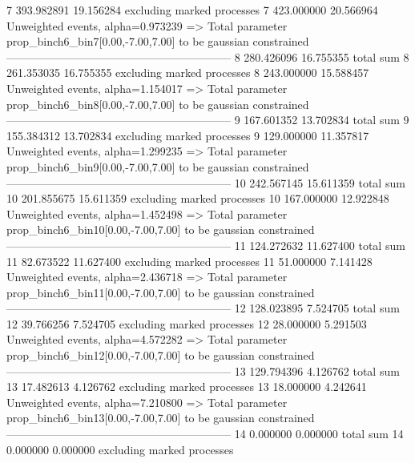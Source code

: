 7          393.982891      19.156284       excluding marked processes    
7          423.000000      20.566964       Unweighted events, alpha=0.973239
  => Total parameter prop_binch6_bin7[0.00,-7.00,7.00] to be gaussian constrained
------------------------------------------------------------
8          280.426096      16.755355       total sum                     
8          261.353035      16.755355       excluding marked processes    
8          243.000000      15.588457       Unweighted events, alpha=1.154017
  => Total parameter prop_binch6_bin8[0.00,-7.00,7.00] to be gaussian constrained
------------------------------------------------------------
9          167.601352      13.702834       total sum                     
9          155.384312      13.702834       excluding marked processes    
9          129.000000      11.357817       Unweighted events, alpha=1.299235
  => Total parameter prop_binch6_bin9[0.00,-7.00,7.00] to be gaussian constrained
------------------------------------------------------------
10         242.567145      15.611359       total sum                     
10         201.855675      15.611359       excluding marked processes    
10         167.000000      12.922848       Unweighted events, alpha=1.452498
  => Total parameter prop_binch6_bin10[0.00,-7.00,7.00] to be gaussian constrained
------------------------------------------------------------
11         124.272632      11.627400       total sum                     
11         82.673522       11.627400       excluding marked processes    
11         51.000000       7.141428        Unweighted events, alpha=2.436718
  => Total parameter prop_binch6_bin11[0.00,-7.00,7.00] to be gaussian constrained
------------------------------------------------------------
12         128.023895      7.524705        total sum                     
12         39.766256       7.524705        excluding marked processes    
12         28.000000       5.291503        Unweighted events, alpha=4.572282
  => Total parameter prop_binch6_bin12[0.00,-7.00,7.00] to be gaussian constrained
------------------------------------------------------------
13         129.794396      4.126762        total sum                     
13         17.482613       4.126762        excluding marked processes    
13         18.000000       4.242641        Unweighted events, alpha=7.210800
  => Total parameter prop_binch6_bin13[0.00,-7.00,7.00] to be gaussian constrained
------------------------------------------------------------
14         0.000000        0.000000        total sum                     
14         0.000000        0.000000        excluding marked processes    
